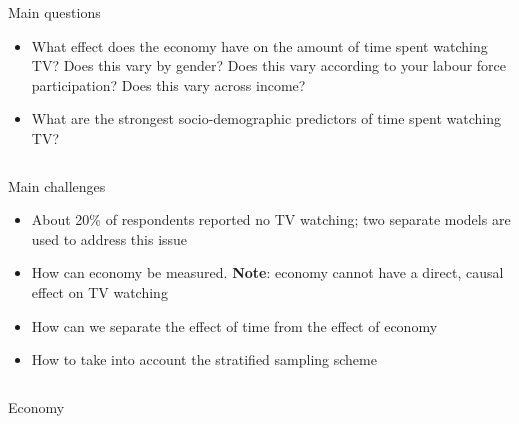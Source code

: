 \documentclass[final]{beamer}
\newcounter{acolumn}%
\def\autoheight{\vspace*{0pt}}%
\begin{document}
\begin{frame}
\begin{acolumns}[t]
\begin{column}{.32\linewidth}
\begin{block}{Main questions}
            \begin{itemize}
            	\item What effect does the economy have on the amount of time spent watching TV? Does this vary by gender? Does this vary according to your labour force participation? Does this vary across income?

            	\item What are the strongest socio-demographic predictors of time spent watching TV?
            \end{itemize}
            \autoheight
           \end{block}
              
          \end{column}
          
        \end{acolumns}
    
    
    \vfill 
    
    \begin{acolumns}[t]
              \begin{column}{.24\linewidth}
              
                \begin{block}{Main challenges}
        		  \begin{itemize}
        		  	\item About 20\% of respondents reported no TV watching; two separate models are used to address this issue
        		  	
        		  	\item How can economy be measured. \textbf{Note}: economy cannot have a direct, causal effect on TV watching
        		  	
        		  	\item How can we separate the effect of time from the effect of economy
        		  	
        		  	\item How to take into account the stratified sampling scheme
        		  \end{itemize}
        			
                  \autoheight 
                \end{block}
                
              
              \end{column}
              
              \begin{column}{.24\linewidth}
                \begin{block}{Economy}
                	

\end{block}
\end{column}
\end{acolumns}
\end{frame}
\end{document}
